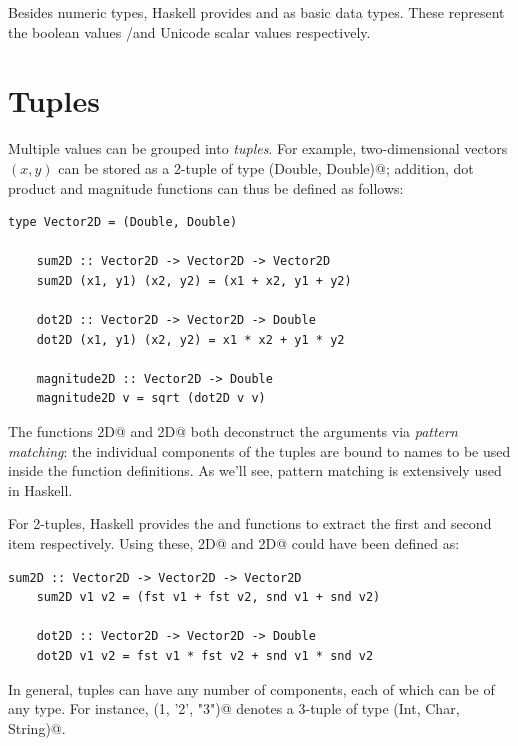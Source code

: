 \documentclass[UdineBachThesis,american,11pt]{PhdThesis}
\begin{document}
  Besides numeric types, Haskell provides \lstinline@Bool@ and \lstinline@Char@
  as basic data types. These represent the boolean values
  \lstinline@True@/\lstinline@False@ and Unicode scalar values respectively.

  \section{Tuples}

  Multiple values can be grouped into \emph{tuples}. For example,
  two-dimensional vectors $\left(x, y\right)$ can be stored as a 2-tuple of type
  \lstinline@(Double, Double)@; addition, dot product and magnitude functions
  can thus be defined as follows:

  \begin{lstlisting}[gobble=4,basicstyle=\ttfamily\small]
    type Vector2D = (Double, Double)

    sum2D :: Vector2D -> Vector2D -> Vector2D
    sum2D (x1, y1) (x2, y2) = (x1 + x2, y1 + y2)

    dot2D :: Vector2D -> Vector2D -> Double
    dot2D (x1, y1) (x2, y2) = x1 * x2 + y1 * y2

    magnitude2D :: Vector2D -> Double
    magnitude2D v = sqrt (dot2D v v)
  \end{lstlisting}

  The functions \lstinline@sum2D@ and \lstinline@dot2D@ both deconstruct the
  arguments via \emph{pattern matching}: the individual components of the tuples
  are bound to names to be used inside the function definitions. As we'll see,
  pattern matching is extensively used in Haskell.

  For 2-tuples, Haskell provides the \lstinline@fst@ and \lstinline@snd@
  functions to extract the first and second item respectively. Using these,
  \lstinline@sum2D@ and \lstinline@dot2D@ could have been defined as:

  \begin{lstlisting}[gobble=4,basicstyle=\ttfamily\small]
    sum2D :: Vector2D -> Vector2D -> Vector2D
    sum2D v1 v2 = (fst v1 + fst v2, snd v1 + snd v2)

    dot2D :: Vector2D -> Vector2D -> Double
    dot2D v1 v2 = fst v1 * fst v2 + snd v1 * snd v2
  \end{lstlisting}

  In general, tuples can have any number of components, each of which can be of
  any type. For instance, \lstinline@(1, '2', "3")@ denotes a 3-tuple of type
  \lstinline@(Int, Char, String)@.
\end{document}
